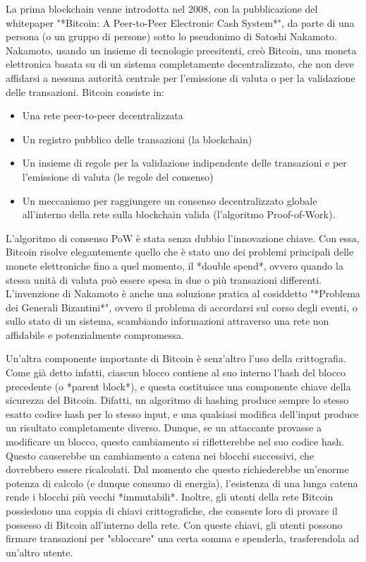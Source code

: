 La prima blockchain venne introdotta nel 2008, con la pubblicazione del whitepaper "*Bitcoin: A Peer-to-Peer Electronic Cash System*", da parte di una persona (o un gruppo di persone) sotto lo pseudonimo di Satoshi Nakamoto. Nakamoto, usando un insieme di tecnologie preesitenti, creò Bitcoin, una moneta elettronica basata su di un sistema completamente decentralizzato, che non deve affidarsi a nessuna autorità centrale per l'emissione di valuta o per la validazione delle transazioni. Bitcoin consiste in:
\begin{itemize}
    \item Una rete peer-to-peer decentralizzata
    \item Un registro pubblico delle transazioni (la blockchain)
    \item Un insieme di regole per la validazione indipendente delle transazioni e per l'emissione di valuta (le regole del consenso)
    \item Un meccanismo per raggiungere un consenso decentralizzato globale all'interno della rete sulla blockchain valida (l'algoritmo Proof-of-Work).
\end{itemize}L'algoritmo di consenso PoW è stata senza dubbio l'innovazione chiave. Con essa, Bitcoin risolve elegantemente quello che è stato uno dei problemi principali delle monete elettroniche fino a quel momento, il *double spend*, ovvero quando la stessa unità di valuta può essere spesa in due o più transazioni differenti. L'invenzione di Nakamoto è anche una soluzione pratica al cosiddetto "*Problema dei Generali Bizantini*", ovvero il problema di accordarsi sul corso degli eventi, o sullo stato di un sistema, scambiando informazioni attraverso una rete non affidabile e potenzialmente compromessa. 

Un'altra componente importante di Bitcoin è senz'altro l'uso della crittografia. Come già detto infatti, ciascun blocco contiene al suo interno l'hash del blocco precedente (o *parent block*), e questa costituisce una componente chiave della sicurezza del Bitcoin. Difatti, un algoritmo di hashing produce sempre lo stesso esatto codice hash per lo stesso input, e una qualsiasi modifica dell'input produce un risultato completamente diverso. Dunque, se un attaccante provasse a modificare un blocco, questo cambiamento si rifletterebbe nel suo codice hash. Questo causerebbe un cambiamento a catena nei blocchi successivi, che dovrebbero essere ricalcolati. Dal momento che questo richiederebbe un'enorme potenza di calcolo (e dunque consumo di energia), l'esistenza di una lunga catena rende i blocchi più vecchi *immutabili*. Inoltre, gli utenti della rete Bitcoin possiedono una coppia di chiavi crittografiche, che consente loro di provare il possesso di Bitcoin all'interno della rete. Con queste chiavi, gli utenti possono firmare transazioni per "sbloccare" una certa somma e spenderla, trasferendola ad un'altro utente.

